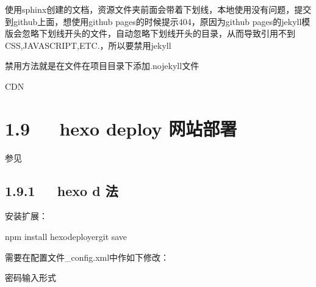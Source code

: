 \documentclass[letterpaper,12pt,english]{sphinxmanual}
\begin{document}
使用sphinx创建的文档，资源文件夹前面会带着下划线，本地使用没有问题，提交到github上面，想使用github pages的时候提示404，原因为github pages的jekyll模版会忽略下划线开头的文件，自动忽略下划线开头的目录，从而导致引用不到CSS,JAVASCRIPT,ETC.，所以要禁用jekyll

禁用方法就是在文件在项目目录下添加.nojekyll文件

CDN




\section{1.9   hexo deploy 网站部署}
\label{\detokenize{001software/001install/001._u7f51_u7ad9/hexo:hexo-deploy}}
参见 


\subsection{1.9.1   hexo d 法}
\label{\detokenize{001software/001install/001._u7f51_u7ad9/hexo:hexo-d}}

安装扩展：

\begin{sphinxVerbatim}[commandchars=\\\{\}]
\PYGZdl{} npm install hexo\PYGZhy{}deployer\PYGZhy{}git \PYGZhy{}\PYGZhy{}save
\end{sphinxVerbatim}

需要在配置文件\_config.xml中作如下修改：

\begin{sphinxVerbatim}[commandchars=\\\{\}]
   
   
   

 
\end{sphinxVerbatim}

密码输入形式
\end{document}
